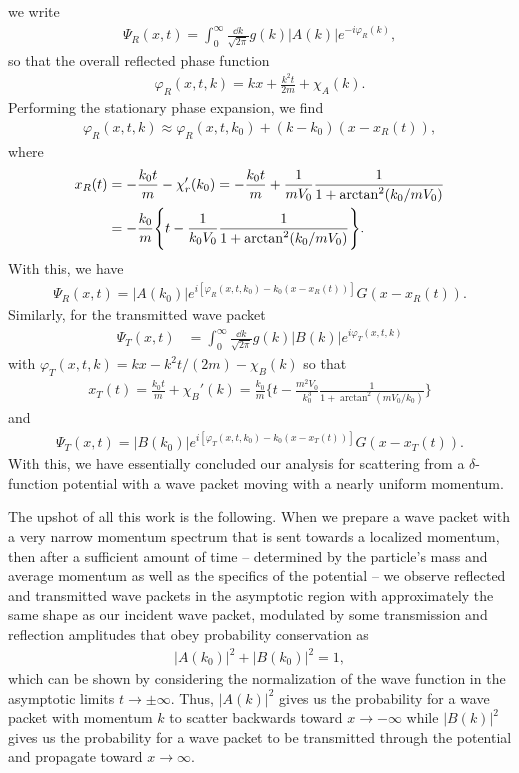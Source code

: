 we write
\begin{align}
    \Psi_{R}(x,t) = \int_{0}^{\infty} \frac{\dd{k}}{\sqrt{2 \pi}} g(k) |A(k)| e^{-i \varphi_{R}(k)}
,\end{align}
so that the overall reflected phase function
\begin{align}
    \varphi_{R}(x,t,k) = kx + \frac{k^2 t}{2m} + \chi_{A}(k)
.\end{align}
Performing the stationary phase expansion, we find
\begin{align}
    \varphi_{R}(x,t,k) \approx \varphi_{R}(x,t,k_0) + (k - k_0) (x - x_{R}(t))
,\end{align}
where 
\begin{align}
    x_{R}(t) &= - \frac{k_0 t}{m} - \chi_{r}'(k_0) = -\frac{k_0 t}{m} + \frac{1}{m V_0} \frac{1}{1 + {\rm arctan}^2(k_0 / m V_0)} \nonumber \\
    &= -\frac{k_0}{m} \Bigg\{ t - \frac{1}{k_0 V_0} \frac{1}{1 + \arctan^2(k_0/m V_0)} \Bigg\}
.\end{align}
With this, we have
\begin{align}
    \Psi_{R}(x,t) = |A(k_0)| e^{i [ \varphi_{R}(x,t,k_0) - k_0(x - x_{R}(t)) ]} G(x - x_{R}(t))
.\end{align}
Similarly, for the transmitted wave packet
\begin{align}
    \Psi_{T}(x,t) &= \int_{0}^{\infty} \frac{\dd{k}}{\sqrt{2 \pi}} g(k) |B(k)| e^{i \varphi_{T}(x,t,k)}
\end{align}
with $\varphi_{T}(x,t,k) = k x - k^2 t / (2m) - \chi_{B}(k)$ so that
\begin{align}
    x_{T}(t) = \frac{k_0 t}{m} + \chi_{B}'(k) = \frac{k_0}{m} \Bigg\{ t - \frac{m^2 V_0}{k_0^3} \frac{1}{1 + \arctan^2(m V_0 / k_0)} \Bigg\}
\end{align}
and
\begin{align}
    \Psi_{T}(x,t) = |B(k_0)| e^{i [ \varphi_{T}(x,t,k_0) - k_0 ( x - x_{T}(t) ) ]} G(x - x_{T}(t))
.\end{align}
With this, we have essentially concluded our analysis for scattering from a $\delta$-function potential with a wave packet moving with a nearly uniform momentum.

The upshot of all this work is the following.
When we prepare a wave packet with a very narrow momentum spectrum that is sent towards a localized momentum, then after a sufficient amount of time -- determined by the particle's mass and average momentum as well as the specifics of the potential -- we observe reflected and transmitted wave packets in the asymptotic region with approximately the same shape as our incident wave packet, modulated by some transmission and reflection amplitudes that obey probability conservation as
\begin{align}
    |A(k_0)|^2 + |B(k_0)|^2 = 1
,\end{align}
which can be shown by considering the normalization of the wave function in the asymptotic limits $t \rightarrow \pm \infty$.
Thus, $|A(k)|^2$ gives us the probability for a wave packet with momentum $k$ to scatter backwards toward $x \rightarrow -\infty$ while $|B(k)|^2$ gives us the probability for a wave packet to be transmitted through the potential and propagate toward $x \rightarrow \infty$.

